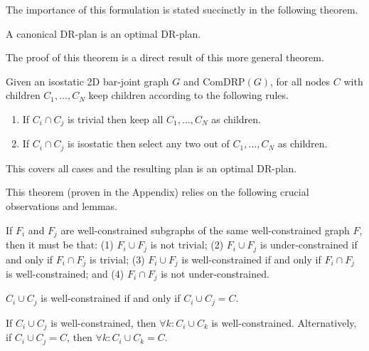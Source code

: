 The importance of this formulation is stated succinctly in the following theorem.

\begin{theorem}\label{theorem:canonical_is_optimal}
    A canonical DR-plan is an optimal DR-plan.
\end{theorem}

The proof of this theorem is a direct result of this more general theorem.

\begin{theorem}\label{theorem:main}
Given an isostatic 2D bar-joint graph $G$ and ComDRP$(G)$, for all nodes $C$ with children $C_1,\ldots,C_N$ keep children according to the following rules.
\begin{enumerate}
    \item If $C_i \cap C_j$ is trivial then keep all $C_1,\ldots,C_N$ as children.
    \item If $C_i \cap C_j$ is isostatic then select any two out of $C_1,\ldots,C_N$ as children.
\end{enumerate}
This covers all cases and the resulting plan is an optimal DR-plan.
\end{theorem}

\begin{remark}
\end{remark}

This theorem (proven in the Appendix) relies on the following crucial observations and lemmas.

\begin{observation}\label{lemma:union_intersection}
If $F_i$ and $F_j$ are well-constrained subgraphs of the same well-constrained graph $F$, then it must be that: (1) $F_i\cup F_j$ is not trivial; (2) $F_i\cup F_j$ is under-constrained if and only if $F_i\cap F_j$ is trivial; (3) $F_i\cup F_j$ is well-constrained if and only if $F_i\cap F_j$ is well-constrained; and (4) $F_i\cap F_j$ is not under-constrained.
\end{observation}

\begin{lemma}\label{lemma:wc_intersection_is_C}
$C_i\cup C_j$ is well-constrained if and only if $C_i\cup C_j = C$.
\end{lemma}

\begin{lemma}\label{lemma:wc_intersection_makes_all_wc}
If $C_i\cup C_j$ is well-constrained, then $\forall k: C_i\cup C_k$ is well-constrained.
Alternatively, if $C_i\cup C_j=C$, then $\forall k: C_i\cup C_k=C$.
\end{lemma}

